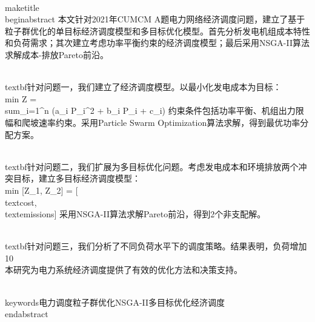 \\maketitle
\\begin{abstract}
    本文针对2021年CUMCM A题电力网络经济调度问题，建立了基于粒子群优化的单目标经济调度模型和多目标优化模型。首先分析发电机组成本特性和负荷需求；其次建立考虑功率平衡约束的经济调度模型；最后采用NSGA-II算法求解成本-排放Pareto前沿。
    
    \\textbf{针对问题一}，我们建立了经济调度模型。以最小化发电成本为目标：
    \\min Z = \\sum_{i=1}^{n} (a_i P_i^2 + b_i P_i + c_i)
    约束条件包括功率平衡、机组出力限幅和爬坡速率约束。采用Particle Swarm Optimization算法求解，得到最优功率分配方案。
    
    \\textbf{针对问题二}，我们扩展为多目标优化问题。考虑发电成本和环境排放两个冲突目标，建立多目标经济调度模型：
    \\min [Z_1, Z_2] = [\\text{cost}, \\text{emissions}]
    采用NSGA-II算法求解Pareto前沿，得到2个非支配解。
    
    \\textbf{针对问题三}，我们分析了不同负荷水平下的调度策略。结果表明，负荷增加10\\%
    
    本研究为电力系统经济调度提供了有效的优化方法和决策支持。
    
    \\keywords{电力调度\quad 粒子群优化\quad NSGA-II\quad 多目标优化\quad 经济调度}
\\end{abstract}
